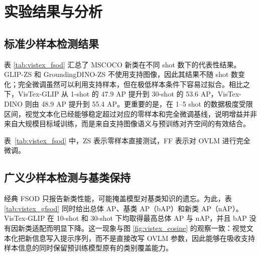 \section{实验结果与分析}
\subsection{标准少样本检测结果}
表 \ref{tab:vistex_fsod} 汇总了 MSCOCO 新类在不同 shot 数下的代表性结果。GLIP-ZS 和 GroundingDINO-ZS 不使用支持图像，因此其结果不随 shot 数变化；完全微调虽然可以利用支持样本，但在极低样本条件下容易过拟合。相比之下，VisTex-GLIP 从 1-shot 的 47.9 AP 提升到 30-shot 的 53.6 AP，VisTex-DINO 则由 48.9 AP 提升到 55.4 AP。更重要的是，在 1--5 shot 的数据极度受限区间，视觉文本化已经能够稳定超过对应的零样本和完全微调基线，说明增益并非来自大规模目标域训练，而是来自支持图像语义与预训练对齐空间的有效结合。

\begin{table}[t]
  \centering
  \caption{MSCOCO 新类少样本检测结果}
  \label{tab:vistex_fsod}
\end{table}
表~\ref{tab:vistex_fsod} 中，ZS 表示零样本直接测试，FF 表示对 OVLM 进行完全微调。


\subsection{广义少样本检测与基类保持}
经典 FSOD 只报告新类性能，可能掩盖模型对基类知识的遗忘。为此，表 \ref{tab:vistex_gfsod} 同时给出总体 AP、基类 AP（bAP）和新类 AP（nAP）。VisTex-GLIP 在 10-shot 和 30-shot 下均取得最高总体 AP 与 nAP，并且 bAP 没有因新类适配而明显下降。这一现象与图 \ref{fig:vistex_cosine} 的观察一致：视觉文本化把新信息写入提示序列，而不是直接改写 OVLM 参数，因此能够在吸收支持样本信息的同时保留预训练模型原有的类别覆盖能力。

